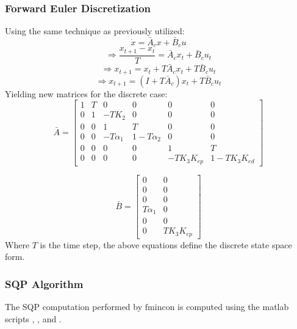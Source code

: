 \subsubsection{Forward Euler Discretization}
Using the same technique as previously utilized:
$$ \dot{x} = \bar{A}_c x + \bar{B}_c u $$
$$ \Rightarrow \frac{x_{t+1} - x_t}{T} = \bar{A}_c x_t + \bar{B}_c u_t $$
$$ \Rightarrow x_{t+1} = x_t + T\bar{A}_c x_t + T\bar{B}_c u_t $$
$$ \Rightarrow x_{t+1} = (I + T\bar{A}_c) x_t + T\bar{B}_c u_t $$
Yielding new matrices for the discrete case:
\begin{equation}
\bar{A} =
\begin{bmatrix}
    1 & T & 0 & 0 & 0 & 0 \\
    0 & 1 & -TK_2 & 0 & 0 & 0 \\
    0 & 0 & 1 & T & 0 & 0 \\
    0 & 0 & -T\alpha_1 & 1-T\alpha_2 & 0 & 0 \\
    0 & 0 & 0 & 0 & 1 & T \\
    0 & 0 & 0 & 0 & -TK_3K_{ep} & 1-TK_3K_{ed}
\end{bmatrix}
\end{equation}

\begin{equation}
\bar{B} =
\begin{bmatrix}
    0 & 0 \\
    0 & 0 \\
    0 & 0 \\
    T\alpha_1 & 0 \\
    0 & 0 \\
    0 & TK_3K_{ep}
\end{bmatrix}
\end{equation}
Where $T$ is the time step, the above equations define the discrete state space form.

\subsubsection{SQP Algorithm}
The SQP computation performed by $\mathrm{fmincon}$ is computed using the matlab scripts , , and .

